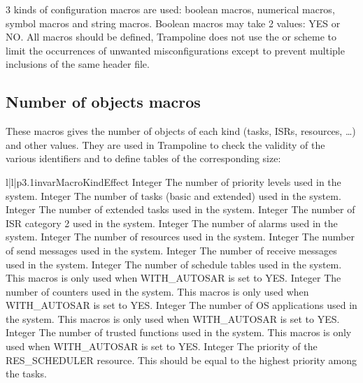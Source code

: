 3 kinds of configuration macros are used: boolean macros, numerical macros, symbol macros and string macros. Boolean macros may take 2 values: YES or NO. All macros should be defined, Trampoline does not use the  or  scheme to limit the occurrences of unwanted misconfigurations except to prevent multiple inclusions of the same header file.

\subsection{Number of objects macros}

These macros gives the number of objects of each kind (tasks, ISRs, resources, \ldots) and other values. They are used in Trampoline to check the validity of the various identifiers and to define tables of the corresponding size:
 
\begin{longtableiii}{l|l|p{3.1in}}{var}{Macro}{Kind}{Effect}
  {Integer}
  {The number of priority levels used in the system.}
  {Integer}
  {The number of tasks (basic and extended) used in the system.}
  {Integer}
  {The number of extended tasks used in the system.}
  {Integer}
  {The number of ISR category 2 used in the system.}
  {Integer}
  {The number of alarms used in the system.}
  {Integer}
  {The number of resources used in the system.}
  {Integer}
  {The number of send messages used in the system.}
  {Integer}
  {The number of receive messages used in the system.}
  {Integer}
  {The number of schedule tables used in the system. This macros is only used when WITH_AUTOSAR is set to YES.}
  {Integer}
  {The number of counters used in the system. This macros is only used when WITH_AUTOSAR is set to YES.}
  {Integer}
  {The number of OS applications used in the system. This macros is only used when WITH_AUTOSAR is set to YES.}
  {Integer}
  {The number of trusted functions used in the system. This macros is only used when WITH_AUTOSAR is set to YES.}
  {Integer}
  {The priority of the RES_SCHEDULER resource. This should be equal to the highest priority among the tasks.}
\end{longtableiii}

